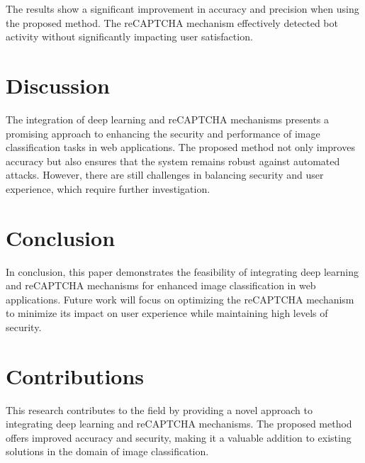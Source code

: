 \documentclass{article}
\begin{document}
The results show a significant improvement in accuracy and precision when using the proposed method. The reCAPTCHA mechanism effectively detected bot activity without significantly impacting user satisfaction.

\section{Discussion}
The integration of deep learning and reCAPTCHA mechanisms presents a promising approach to enhancing the security and performance of image classification tasks in web applications. The proposed method not only improves accuracy but also ensures that the system remains robust against automated attacks. However, there are still challenges in balancing security and user experience, which require further investigation.

\section{Conclusion}
In conclusion, this paper demonstrates the feasibility of integrating deep learning and reCAPTCHA mechanisms for enhanced image classification in web applications. Future work will focus on optimizing the reCAPTCHA mechanism to minimize its impact on user experience while maintaining high levels of security.

\section{Contributions}
This research contributes to the field by providing a novel approach to integrating deep learning and reCAPTCHA mechanisms. The proposed method offers improved accuracy and security, making it a valuable addition to existing solutions in the domain of image classification.
\end{document}
